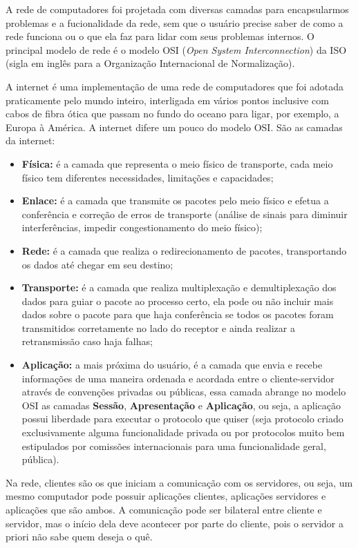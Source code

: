 \documentclass[brazilian,a4paper,twocolumn]{article}
\begin{document}
A rede de computadores foi projetada com diversas camadas para encapsularmos problemas e a fucionalidade da rede, sem que o usuário precise saber de como a rede funciona ou o que ela faz para lidar com seus problemas internos. O principal modelo de rede é o modelo OSI (\textit{Open System Interconnection}) da ISO (sigla em inglês para a Organização Internacional de Normalização).

A internet é uma implementação de uma rede de computadores que foi adotada praticamente pelo mundo inteiro, interligada em vários pontos inclusive com cabos de fibra ótica que passam no fundo do oceano para ligar, por exemplo, a Europa à América. A internet difere um pouco do modelo OSI. São as camadas da internet:

\begin{itemize}
    \item{\textbf{Física:} é a camada que representa o meio físico de transporte, cada meio físico tem diferentes necessidades, limitações e capacidades;}
    \item{\textbf{Enlace:} é a camada que transmite os pacotes pelo meio físico e efetua a conferência e correção de erros de transporte (análise de sinais para diminuir interferências, impedir congestionamento do meio físico);}
    \item{\textbf{Rede:} é a camada que realiza o redirecionamento de pacotes, transportando os dados até chegar em seu destino;}
    \item{\textbf{Transporte:} é a camada que realiza multiplexação e demultiplexação dos dados para guiar o pacote ao processo certo, ela pode ou não incluir mais dados sobre o pacote para que haja conferência se todos os pacotes foram transmitidos corretamente no lado do receptor e ainda realizar a retransmissão caso haja falhas;}
    \item{\textbf{Aplicação:} a mais próxima do usuário, é a camada que envia e recebe informações de uma maneira ordenada e acordada entre o cliente-servidor através de convenções privadas ou públicas, essa camada abrange no modelo OSI as camadas \textbf{Sessão}, \textbf{Apresentação} e \textbf{Aplicação}, ou seja, a aplicação possui liberdade para executar o protocolo que quiser (seja protocolo criado exclusivamente alguma funcionalidade privada ou por protocolos muito bem estipulados por comissões internacionais para uma funcionalidade geral, pública).}
\end{itemize}

Na rede, clientes são os que iniciam a comunicação com os servidores, ou seja, um mesmo computador pode possuir aplicações clientes, aplicações servidores e aplicações que são ambos. A comunicação pode ser bilateral entre cliente e servidor, mas o início dela deve acontecer por parte do cliente, pois o servidor a priori não sabe quem deseja o quê.
\end{document}
